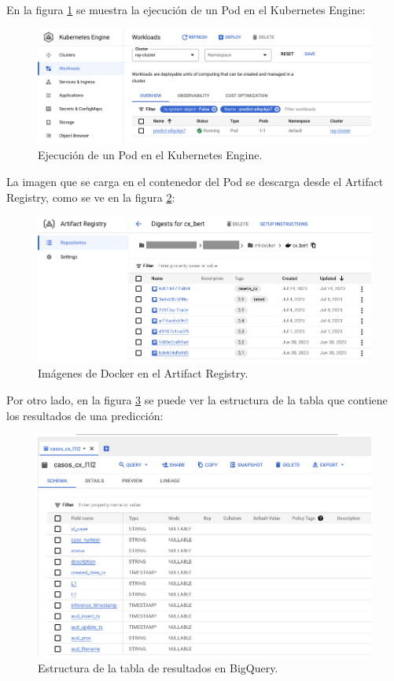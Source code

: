 En la figura \ref{fig:cap4-pod} se muestra la ejecución de un Pod en el Kubernetes Engine:

\begin{figure}[H]
	\centering
	\includegraphics[width=1\textwidth]{./Figures/cap4-pod.png}
	\caption{Ejecución de un Pod en el Kubernetes Engine.}
	\label{fig:cap4-pod}
\end{figure}

La imagen que se carga en el contenedor del Pod se descarga desde el Artifact Registry, como se ve en la figura \ref{fig:cap4-ar}:

\begin{figure}[H]
	\centering
	\includegraphics[width=1\textwidth]{./Figures/cap4-ar.png}
	\caption{Imágenes de Docker en el Artifact Registry.}
	\label{fig:cap4-ar}
\end{figure}

Por otro lado, en la figura \ref{fig:cap4-bq} se puede ver la estructura de la tabla que contiene los resultados de una predicción:

\begin{figure}[htpb]
	\centering
	\includegraphics[width=1\textwidth]{./Figures/cap4-bq.png}
	\caption{Estructura de la tabla de resultados en BigQuery.}
	\label{fig:cap4-bq}
\end{figure}

